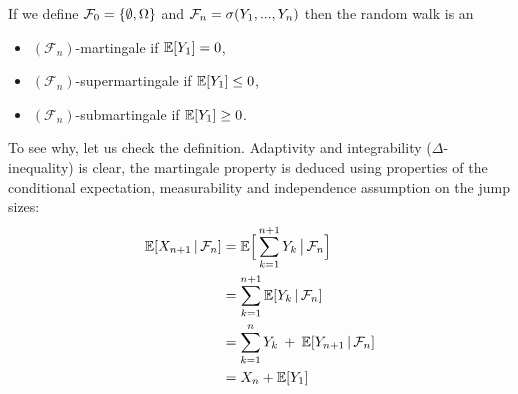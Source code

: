 \begin{example}
		
			If we define $\mathcal{F}_0 = \lbrace \emptyset,\Omega \rbrace$ and $\mathcal{F}_n = \sigma(Y_1,...,Y_n)$ then the random walk is an
			\begin{itemize}
				\item
					$(\mathcal F_n)$-martingale if $\mathbb{E}[Y_1]=0$,
				\item
					$(\mathcal F_n)$-supermartingale if $\mathbb{E}[Y_1] \leq 0$,
				\item
					$(\mathcal F_n)$-submartingale if $\mathbb{E}[Y_1] \geq 0$.
			\end{itemize}
			To see why, let us check the definition. Adaptivity and integrability ($\Delta$-inequality) is clear, the martingale property is deduced using properties of the conditional expectation, measurability and independence assumption on the jump sizes:
			\begin{align*}
				\E[X_{n+1}\,|\,\cF_n] &= \E \Big[ \sum\limits_{k=1}^{n+1}Y_k \,\big|\,\cF_n\Big]\\
											&= \sum\limits_{k=1}^{n+1} \E[Y_k\,|\,\cF_n] \\
											&= \sum\limits_{k=1}^{n}Y_k \: + \: \E[Y_{n+1}\,|\,\cF_n]\\%
											&= X_n + \E[Y_1]
			\end{align*}
\end{example}
